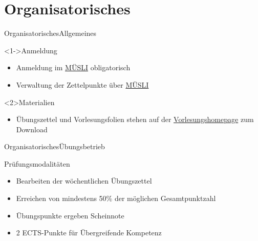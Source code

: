 \documentclass[
	vorläufig=false,
	datum=2017-10-20,
	titel={Einführung und grundlegende Bedienung},
	web=true,
	max,
	mo,
	aspectratio=1610,
]{../tex/latexkurs-slides}
\begin{document}
\section{Organisatorisches}

\begin{frame}[t]{Organisatorisches}{Allgemeines}
	\begin{block}<1->{Anmeldung}
		\begin{itemize}
			\item	 Anmeldung im \href{https://muesli.mathi.uni-heidelberg.de/lecture/view/750}{MÜSLI} obligatorisch
			\item Verwaltung der Zettelpunkte über \href{https://muesli.mathi.uni-heidelberg.de/lecture/view/750}{MÜSLI}
		\end{itemize}
	\end{block}
	\begin{block}{Materialien}
		\begin{itemize}
			\item Übungszettel und Vorlesungsfolien stehen auf der \href{http://latexkurs.github.io}{Vorlesungshomepage} zum Download
		\end{itemize}
	\end{block}
\end{frame}

\begin{frame}[t]{Organisatorisches}{Übungsbetrieb}
	\begin{block}{Prüfungsmodalitäten}
		\begin{itemize}
			\item Bearbeiten der wöchentlichen Übungszettel
			\item Erreichen von mindestens 50\% der möglichen Gesamtpunktzahl
			\item Übungspunkte ergeben Scheinnote 
			\item 2 ECTS-Punkte für Übergreifende Kompetenz
		\end{itemize}
	\end{block}
\end{frame}
\end{document}
